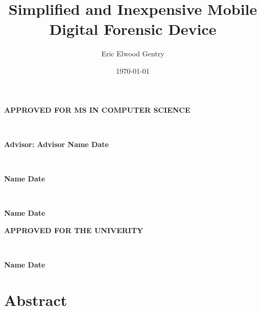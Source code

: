 \documentclass[12pt]{article}
\begin{document}
\begin{center}
{\large \bfseries APPROVED FOR MS IN COMPUTER SCIENCE \par}

\vspace{1.5 cm}

\hrulefill\\
{\large \bfseries Advisor: Advisor Name \hfill Date \par}

\vspace{1.5 cm}

\hrulefill\\
{\large \bfseries Name \hfill Date \par}

\vspace{1.5 cm}

\hrulefill\\
{\large \bfseries Name \hfill Date \par}

\vspace{3 cm}

{\large \bfseries APPROVED FOR THE UNIVERITY \par}

\vspace{1.5 cm}

\hrulefill\\
{\large \bfseries Name \hfill Date \par}
\end{center}

\newpage



\newpage

\title{Simplified and Inexpensive Mobile Digital Forensic Device} 
\author{Eric Elwood Gentry}

\date{\today}
\maketitle

\begin{abstract}
\end{abstract}

\newpage
{}

\tableofcontents

\newpage

\listoffigures

\newpage
{}

\section{Abstract}
\label{sect-abstract}
\end{document}
